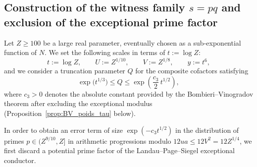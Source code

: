 \documentclass[11pt, a4paper]{article}
\theoremstyle{plain}
\theoremstyle{definition}
\begin{document}
\subsection{Construction of the witness family $s = pq$ and exclusion of the exceptional prime factor}\label{subsec:construction_pq}
Let $Z \ge 100$ be a large real parameter, eventually chosen as a sub-exponential function of $N$. We set the following scales in terms of $t := \log Z$:
\begin{equation}\label{eq:echelles_pq}
t := \log Z, \qquad U := Z^{1/10}, \qquad V := Z^{1/8}, \qquad y := t^6,
\end{equation}
and we consider a truncation parameter $Q$ for the composite cofactors satisfying
\begin{equation}\label{eq:plage_Q}
\exp\!\big(t^{1/3}\big) \le Q \le \exp\!\left(\frac{c_3}{2}\,t^{1/2}\right),
\end{equation}
where $c_3 > 0$ denotes the absolute constant provided by the Bombieri--Vinogradov theorem after excluding the exceptional modulus (Proposition~\ref{prop:BV_poids_tau} below).

In order to obtain an error term of size $\exp(-c_3 t^{1/2})$ in the distribution of primes $p \in (Z^{9/10}, Z]$ in arithmetic progressions modulo $12ua \le 12V^2 = 12Z^{1/4}$, we first discard a potential prime factor of the Landau--Page--Siegel exceptional conductor.
\end{document}
